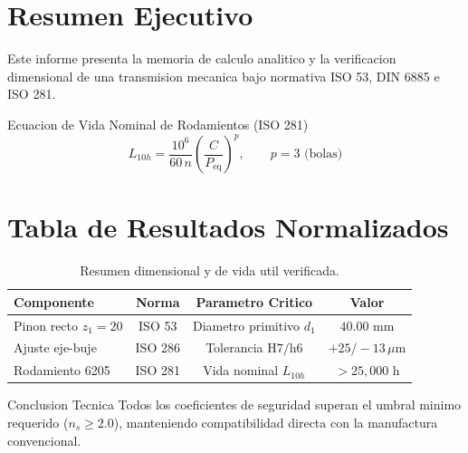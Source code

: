 \documentclass[11pt,a4paper]{engineering_report}
\begin{document}
\makeengineeringcover

\section{Resumen Ejecutivo}
Este informe presenta la memoria de calculo analitico y la verificacion dimensional de una transmision mecanica bajo normativa ISO 53, DIN 6885 e ISO 281.

\begin{sciformula}{Ecuacion de Vida Nominal de Rodamientos (ISO 281)}
\[
L_{10h} = \frac{10^6}{60\,n} \left( \frac{C}{P_{\mathrm{eq}}} \right)^p, \qquad p = 3 \text{ (bolas)}
\]
\end{sciformula}

\section{Tabla de Resultados Normalizados}
\begin{table}[H]
\centering
\caption{Resumen dimensional y de vida util verificada.}
\begin{tabular}{@{}lccc@{}}
\toprule
\textbf{Componente} & \textbf{Norma} & \textbf{Parametro Critico} & \textbf{Valor} \\
\midrule
Pinon recto $z_1=20$ & ISO 53 & Diametro primitivo $d_1$ & $40.00\text{ mm}$ \\
Ajuste eje-buje & ISO 286 & Tolerancia $\mathrm{H7/h6}$ & $+25 / -13\,\mu\text{m}$ \\
Rodamiento 6205 & ISO 281 & Vida nominal $L_{10h}$ & $> 25{,}000\text{ h}$ \\
\bottomrule
\end{tabular}
\end{table}

\begin{scibox}{Conclusion Tecnica}
Todos los coeficientes de seguridad superan el umbral minimo requerido ($n_s \ge 2.0$), manteniendo compatibilidad directa con la manufactura convencional.
\end{scibox}
\end{document}
